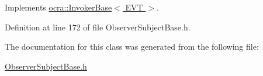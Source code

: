 Implements \hyperlink{classocra_1_1InvokerBase_ae4d7537a1b2c0aa9b5188c5da8423289}{ocra\+::\+Invoker\+Base$<$ E\+V\+T $>$}.



Definition at line 172 of file Observer\+Subject\+Base.\+h.



The documentation for this class was generated from the following file\+:\begin{DoxyCompactItemize}
\item 
\hyperlink{ObserverSubjectBase_8h}{Observer\+Subject\+Base.\+h}\end{DoxyCompactItemize}
